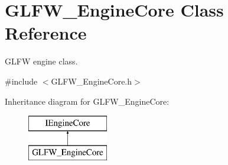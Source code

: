 \hypertarget{class_g_l_f_w___engine_core}{}\section{G\+L\+F\+W\+\_\+\+Engine\+Core Class Reference}
\label{class_g_l_f_w___engine_core}


G\+L\+FW engine class.  




{\ttfamily \#include $<$G\+L\+F\+W\+\_\+\+Engine\+Core.\+h$>$}

Inheritance diagram for G\+L\+F\+W\+\_\+\+Engine\+Core\+:\begin{figure}[H]
\begin{center}
\leavevmode
\includegraphics[height=2.000000cm]{class_g_l_f_w___engine_core}
\end{center}
\end{figure}
